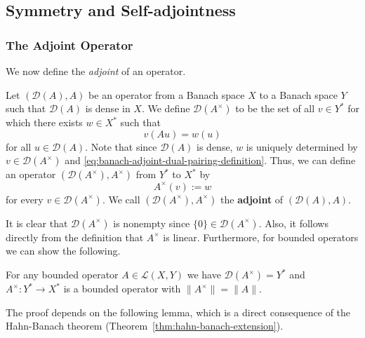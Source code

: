 \subsection{Symmetry and Self-adjointness}\label{sec:symmetry-and-self-adjointness}\label{sec:adjoint-operators}

\subsubsection{The Adjoint Operator}\label{subsec:banach-adjoint-operator}

We now define the \emph{adjoint} of an operator.

\begin{Definition}
\label{def:banach-adjoint-operator}
Let $(\mathcal{D}(A),A)$ be an operator from a Banach space $X$ to a Banach space $Y$ such that $\mathcal{D}(A)$ is dense in $X$. We define $\mathcal{D}(A^\times)$ to be the set of all $v\in Y^*$ for which there exists $w\in X^*$ such that
\begin{equation}\label{eq:banach-adjoint-dual-pairing-definition}
v(Au)=w(u)
\end{equation}
for all $u\in\mathcal{D}(A)$. Note that since $\mathcal{D}(A)$ is dense, $w$ is uniquely determined by $v\in\mathcal{D}(A^\times)$ and \eqref{eq:banach-adjoint-dual-pairing-definition}. Thus, we can define an operator $(\mathcal{D}(A^\times),A^\times)$ from $Y^*$ to $X^*$ by
\begin{equation}\label{eq:banach-adjoint-action-definition}
A^\times(v):=w
\end{equation}
for every $v\in\mathcal{D}(A^\times)$. We call $(\mathcal{D}(A^\times),A^\times)$ the \textbf{adjoint} of $(\mathcal{D}(A),A)$.
\end{Definition}

It is clear that $\mathcal{D}(A^\times)$ is nonempty since $\{0\}\in\mathcal{D}(A^\times)$. Also, it follows directly from the definition that $A^\times$ is linear. Furthermore, for bounded operators we can show the following.

\begin{Theorem}
\label{thm:bounded-adjoint-domain-and-norm}
For any bounded operator $A\in\mathcal{L}(X,Y)$ we have $\mathcal{D}(A^\times)=Y^*$ and $A^\times:Y^*\to X^*$ is a bounded operator with $\|A^\times\|=\|A\|$.
\end{Theorem}

The proof depends on the following lemma, which is a direct consequence of the Hahn-Banach theorem (Theorem~\ref{thm:hahn-banach-extension}).

